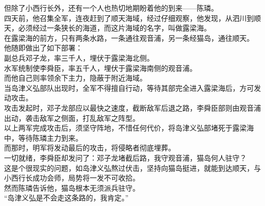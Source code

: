 \begin{multicols}{\theparacolNo}
但除了小西行长外，还有一个人也热切地期盼着他的到来——陈璘。\\

四天前，他召集全军，连夜赶到了顺天海域，经过仔细观察，他发现，从泗川到顺天，必须经过一条狭长的海道，而这片海域的名字，叫做露梁海。\\

在露梁海的前方，只有两条水路，一条通往观音浦，另一条经猫岛，通往顺天。\\

他随即做出了如下部署：\\

副总兵邓子龙，率三千人，埋伏于露梁海北侧。\\

水军统制使李舜臣，率五千人，埋伏于露梁海南侧的观音浦。\\

而他自己则率领余下主力，隐蔽于附近海域。\\

当岛津义弘部队出现时，全军不得擅自行动，等待其部完全进入露梁海后，方可发动攻击。\\

攻击发起时，邓子龙部应以最快之速度，截断敌军后退之路，李舜臣部则由观音浦出动，袭击敌军之侧面，打乱敌军之阵型。\\

以上两军完成攻击后，须坚守阵地，不惜任何代价，将岛津义弘部堵死于露梁海中，等待陈璘主力到来。\\

而那时，明军将发动最后的攻击，将侵略者彻底埋葬。\\

一切就绪，李舜臣却发问了：邓子龙堵截后路，我守观音浦，猫岛何人驻守？\\

这是个很现实的问题，如岛津义弘熬过伏击，坚持向猫岛挺进，就能到达顺天，与小西行长成功会师，局势将一发不可收拾。\\

然而陈璘告诉他，猫岛根本无须派兵驻守。\\

“岛津义弘是不会走这条路的，我肯定。”\\
\ifnum{}
	\end{multicols}
\fi
\newpage

